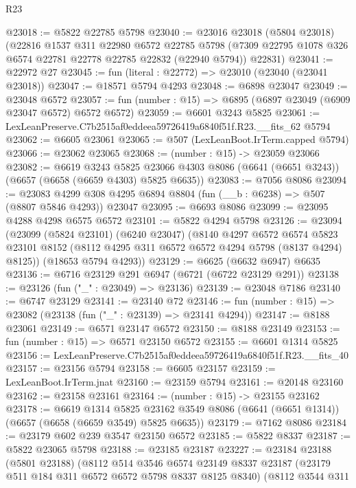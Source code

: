 \begin{lexlean}{R23}
\begin{coremodule}
@23018 := @5822 @22785 @5798
@23040 := @23016
    @23018
    (@5804 @23018)
    (@22816
      @1537
      @311
      @22980
      @6572
      @22785
      @5798
      (@7309 @22795 @1078 @326 @6574 @22781 @22778 @22785 @22832 (@22940 @5794))
      @22831)
@23041 := @22972 @27
@23045 := fun (literal : @22772) => @23010 (@23040 (@23041 @23018))
@23047 := @18571 @5794 @4293
@23048 := @6898 @23047
@23049 := @23048 @6572
@23057 := fun (number : @15) => @6895 (@6897 @23049 (@6909 @23047 @6572) @6572 @6572)
@23059 := @6601 @3243 @5825
@23061 := LexLeanPreserve.C7b2515af0eddeea59726419a6840f51f.R23.__fits_62 @5794
@23062 := @6605 @23061
@23065 := @507 (LexLeanBoot.IrTerm.capped @5794)
@23066 := @23062 @23065
@23068 := (number : @15) -> @23059 @23066
@23082 := @6619
    @3243
    @5825
    @23066
    @4303
    @8086
    (@6641 (@6651 @3243))
    (@6657 (@6658 (@6659 @4303) @5825 @6635))
@23083 := @7056 @8086
@23094 := @23083 @4299 @308 @4295 @6894 @8804 (fun (__b : @6238) => @507 (@8807 @5846 @4293)) @23047
@23095 := @6693 @8086
@23099 := @23095 @4288 @4298 @6575 @6572
@23101 := @5822 @4294 @5798
@23126 := @23094
    (@23099
      (@5824 @23101)
      (@6240 @23047)
      (@8140
        @4297
        @6572
        @6574
        @5823
        @23101
        @8152
        (@8112 @4295 @311 @6572 @6572 @4294 @5798 (@8137 @4294) @8125))
      (@18653 @5794 @4293))
@23129 := @6625 (@6632 @6947) @6635
@23136 := @6716 @23129 @291 @6947 (@6721 (@6722 @23129 @291))
@23138 := @23126 (fun ("_" : @23049) => @23136)
@23139 := @23048 @7186
@23140 := @6747 @23129
@23141 := @23140 @72
@23146 := fun (number : @15) => @23082 (@23138 (fun ("_" : @23139) => @23141 @4294))
@23147 := @8188 @23061
@23149 := @6571 @23147 @6572
@23150 := @8188 @23149
@23153 := fun (number : @15) => @6571 @23150 @6572
@23155 := @6601 @1314 @5825
@23156 := LexLeanPreserve.C7b2515af0eddeea59726419a6840f51f.R23.__fits_40
@23157 := @23156 @5794
@23158 := @6605 @23157
@23159 := LexLeanBoot.IrTerm.jnat
@23160 := @23159 @5794
@23161 := @20148 @23160
@23162 := @23158 @23161
@23164 := (number : @15) -> @23155 @23162
@23178 := @6619
    @1314
    @5825
    @23162
    @3549
    @8086
    (@6641 (@6651 @1314))
    (@6657 (@6658 (@6659 @3549) @5825 @6635))
@23179 := @7162 @8086
@23184 := @23179 @602 @239 @3547 @23150 @6572
@23185 := @5822 @8337
@23187 := @5822 @23065 @5798
@23188 := @23185 @23187
@23227 := @23184
    @23188
    (@5801 @23188)
    (@8112
      @514
      @3546
      @6574
      @23149
      @8337
      @23187
      (@23179 @511 @184 @311 @6572 @6572 @5798 @8337 @8125 @8340)
      (@8112
        @3544
        @311

\end{coremodule}
\end{lexlean}
